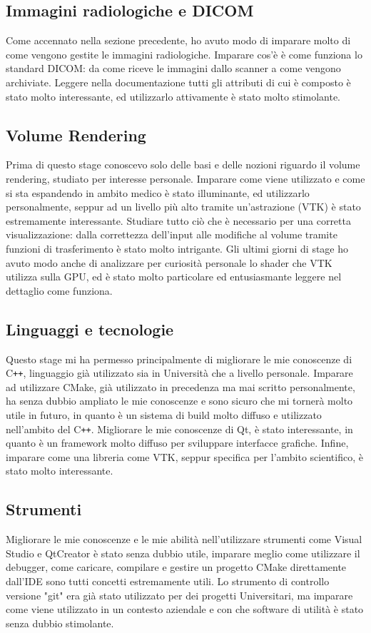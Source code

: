 \subsection{Immagini radiologiche e DICOM}
Come accennato nella sezione precedente, ho avuto modo di imparare molto di come vengono gestite le immagini radiologiche. Imparare cos'è è come funziona lo standard DICOM: da come riceve le immagini dallo scanner a come vengono archiviate. Leggere nella documentazione tutti gli attributi di cui è composto è stato molto interessante, ed utilizzarlo attivamente è stato molto stimolante.

\subsection{Volume Rendering}
Prima di questo stage conoscevo solo delle basi e delle nozioni riguardo il volume rendering, studiato per interesse personale. Imparare come viene utilizzato e come si sta espandendo in ambito medico è stato illuminante, ed utilizzarlo personalmente, seppur ad un livello più alto tramite un'astrazione (VTK) è stato estremamente interessante. Studiare tutto ciò che è necessario per una corretta visualizzazione: dalla correttezza dell'input alle modifiche al volume tramite funzioni di trasferimento è stato molto intrigante. Gli ultimi giorni di stage ho avuto modo anche di analizzare per curiosità personale lo shader che VTK utilizza sulla GPU, ed è stato molto particolare ed entusiasmante leggere nel dettaglio come funziona.

\subsection{Linguaggi e tecnologie}
Questo stage mi ha permesso principalmente di migliorare le mie conoscenze di C\texttt{++}, linguaggio già utilizzato sia in Università che a livello personale. Imparare ad utilizzare CMake, già utilizzato in precedenza ma mai scritto personalmente, ha senza dubbio ampliato le mie conoscenze e sono sicuro che mi tornerà molto utile in futuro, in quanto è un sistema di build molto diffuso e utilizzato nell'ambito del C\texttt{++}. Migliorare le mie conoscenze di Qt, è stato interessante, in quanto è un framework molto diffuso per sviluppare interfacce grafiche. Infine, imparare come una libreria come VTK, seppur specifica per l'ambito scientifico, è stato molto interessante. 

\subsection{Strumenti}
Migliorare le mie conoscenze e le mie abilità nell'utilizzare strumenti come Visual Studio e QtCreator è stato senza dubbio utile, imparare meglio come utilizzare il debugger, come caricare, compilare e gestire un progetto CMake direttamente dall'IDE sono tutti concetti estremamente utili. Lo strumento di controllo versione "git" era già stato utilizzato per dei progetti Universitari, ma imparare come viene utilizzato in un contesto aziendale e con che software di utilità è stato senza dubbio stimolante.

